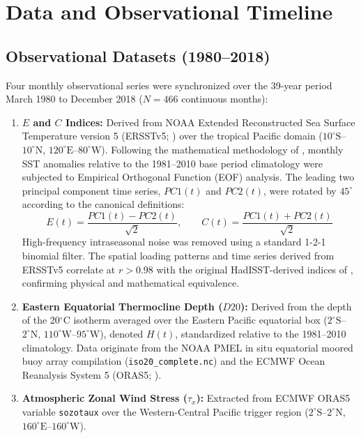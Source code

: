 \documentclass[11pt,a4paper]{article}
\begin{document}
\section{Data and Observational Timeline}

\subsection{Observational Datasets (1980--2018)}
Four monthly observational series were synchronized over the 39-year period March 1980 to December 2018 ($N = 466$ continuous months):
\begin{enumerate}
    \item \textbf{$E$ and $C$ Indices:} Derived from NOAA Extended Reconstructed Sea Surface Temperature version 5 (ERSSTv5; \citealt{huang2017extended}) over the tropical Pacific domain ($10^\circ\text{S}$--$10^\circ\text{N}$, $120^\circ\text{E}$--$80^\circ\text{W}$). Following the mathematical methodology of \citet{takahashi2011enso}, monthly SST anomalies relative to the 1981--2010 base period climatology were subjected to Empirical Orthogonal Function (EOF) analysis. The leading two principal component time series, $PC1(t)$ and $PC2(t)$, were rotated by $45^\circ$ according to the canonical definitions:
    \begin{equation}
    E(t) = \frac{PC1(t) - PC2(t)}{\sqrt{2}}, \qquad C(t) = \frac{PC1(t) + PC2(t)}{\sqrt{2}}
    \end{equation}
    High-frequency intraseasonal noise was removed using a standard 1-2-1 binomial filter. The spatial loading patterns and time series derived from ERSSTv5 correlate at $r > 0.98$ with the original HadISST-derived indices of \citet{takahashi2011enso}, confirming physical and mathematical equivalence.
    \item \textbf{Eastern Equatorial Thermocline Depth ($D20$):} Derived from the depth of the 20$^\circ$C isotherm averaged over the Eastern Pacific equatorial box ($2^\circ\text{S}$--$2^\circ\text{N}$, $110^\circ\text{W}$--$95^\circ\text{W}$), denoted $H(t)$, standardized relative to the 1981--2010 climatology. Data originate from the NOAA PMEL in situ equatorial moored buoy array compilation (\texttt{iso20\_complete.nc}) and the ECMWF Ocean Reanalysis System 5 (ORAS5; \citealt{zuo2019ecmwf}).
    \item \textbf{Atmospheric Zonal Wind Stress ($\tau_x$):} Extracted from ECMWF ORAS5 variable \texttt{sozotaux} over the Western-Central Pacific trigger region ($2^\circ\text{S}$--$2^\circ\text{N}$, $160^\circ\text{E}$--$160^\circ\text{W}$).
\end{enumerate}
\end{document}
